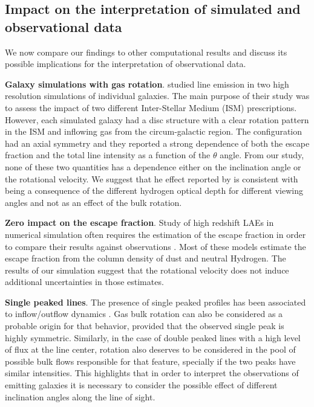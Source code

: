 \documentclass{emulateapj}
\newcommand{\ly}{{\ifmmode{{\rm Ly}\alpha~}\else{Ly$\alpha$~}\fi}}
\begin{document}
\subsection{Impact on the interpretation of simulated and
  observational data}


We now compare our findings to other computational results and discuss
its possible implications  for the interpretation of observational data.

{\bf Galaxy simulations with gas rotation}. \cite{Verhamme12} studied \ly
line emission in two high resolution simulations of individual
galaxies. 
The main purpose of their study was to assess the impact of two
different Inter-Stellar Medium (ISM) prescriptions. 
However, each simulated galaxy had a disc structure with a clear rotation pattern in
the ISM and inflowing gas from the circum-galactic region. 
The configuration had an axial symmetry and they reported a strong dependence of both
the escape fraction and the total line intensity as a function of the
$\theta$ angle. 
From our study, none of these two quantities has a dependence either
on the inclination angle or the rotational velocity. 
We suggest that he effect reported by \cite{Verhamme12} is
consistent with being a consequence of the different hydrogen optical
depth for different viewing angles and not as an effect of the bulk
rotation.


{\bf Zero impact on the \ly escape fraction}. Study of
high redshift LAEs in numerical simulation often requires the
estimation of the \ly escape fraction in order to compare their
results against observations
\citep{CLARA,Dayal2012,Forero12,Orsi12,Garel2012}. Most of these
models estimate the escape fraction from the column density of dust and
neutral Hydrogen. The results of our simulation suggest that the
rotational velocity does not induce additional uncertainties in those
estimates.


{\bf Single peaked lines}. The presence of single peaked profiles has
been associated to inflow/outflow dynamics
\citep{Verhamme06,DijkstraKramer}. 
Gas bulk rotation can also be considered as a probable origin for that
behavior, provided that the observed single peak is highly
symmetric. 
Similarly, in the case of double peaked lines with a high
level of flux at the line center, rotation also deserves to be
considered in the pool of possible bulk flows responsible for that feature,
specially if the two peaks have similar intensities. 
This highlights
that in order to interpret the observations of \ly emitting galaxies
it is necessary to consider the possible effect of different
inclination angles along the line of sight.
\end{document}

